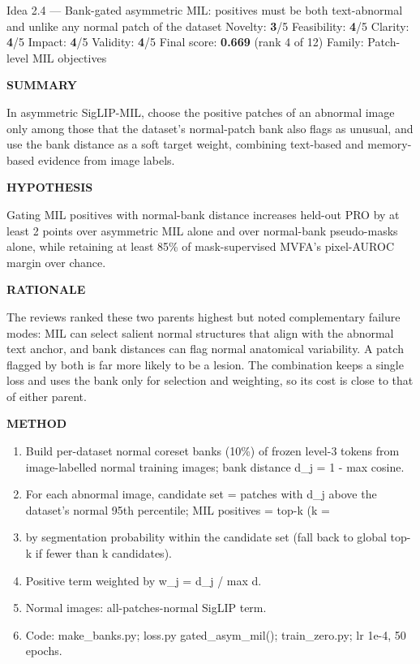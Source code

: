 \documentclass[11pt,a4paper]{article}
\newcommand{\lbl}[1]{{\sffamily\footnotesize\bfseries\color{muted}\MakeUppercase{#1}}\par}
\begin{document}
\begin{ideabox}{Idea 2.4 — Bank-gated asymmetric MIL: positives must be both text-abnormal and unlike any normal patch of the dataset}
{\small Novelty: \textbf{3}/5 \quad Feasibility: \textbf{4}/5 \quad Clarity: \textbf{4}/5 \quad Impact: \textbf{4}/5 \quad Validity: \textbf{4}/5 \quad Final score: \textbf{0.669} (rank 4 of 12) \quad Family: Patch-level MIL objectives}\par\smallskip
\lbl{Summary}In asymmetric SigLIP-MIL, choose the positive patches of an abnormal image only among those that the dataset's normal-patch bank also flags as unusual, and use the bank distance as a soft target weight, combining text-based and memory-based evidence from image labels.

\lbl{Hypothesis}Gating MIL positives with normal-bank distance increases held-out PRO by at least 2 points over asymmetric MIL alone and over normal-bank pseudo-masks alone, while retaining at least 85\% of mask-supervised MVFA's pixel-AUROC margin over chance.

\lbl{Rationale}The reviews ranked these two parents highest but noted complementary failure modes: MIL can select salient normal structures that align with the abnormal text anchor, and bank distances can flag normal anatomical variability. A patch flagged by both is far more likely to be a lesion. The combination keeps a single loss and uses the bank only for selection and weighting, so its cost is close to that of either parent.

\lbl{Method}\begin{enumerate}[leftmargin=1.6em,itemsep=1pt,topsep=2pt]
\item Build per-dataset normal coreset banks (10\%) of frozen level-3 tokens from image-labelled normal training images; bank distance d\_\allowbreak{}j = 1 - max cosine.
\item For each abnormal image, candidate set = patches with d\_\allowbreak{}j above the dataset's normal 95th percentile; MIL positives = top-k (k =
\item by segmentation probability within the candidate set (fall back to global top-k if fewer than k candidates).
\item Positive term weighted by w\_\allowbreak{}j = d\_\allowbreak{}j / max d.
\item Normal images: all-patches-normal SigLIP term.
\item Code: make\_\allowbreak{}banks.py; loss.py gated\_\allowbreak{}asym\_\allowbreak{}mil(); train\_\allowbreak{}zero.py; lr 1e-4, 50 epochs.
\end{enumerate}


\end{ideabox}
\end{document}
